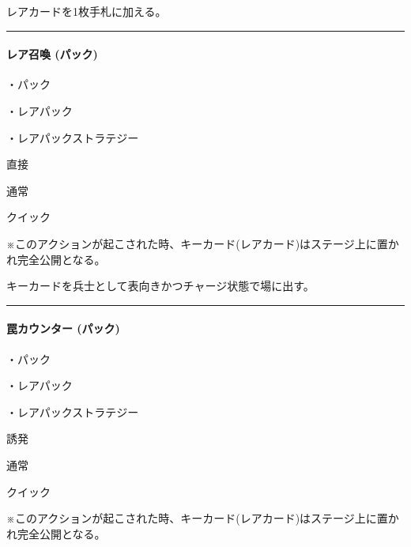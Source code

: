 \documentclass[letterpaper,10pt,dvipdfmx]{sphinxmanual}
\begin{document}
\sphinxAtStartPar
レアカードを1枚手札に加える。


\bigskip\hrule\bigskip



\paragraph{レア召喚 (パック)}
\label{\detokenize{auto/frameActionlist:act-summonsrare}}\label{\detokenize{auto/frameActionlist:id5}}
\sphinxAtStartPar
{}

\sphinxAtStartPar
・パック

\sphinxAtStartPar
・レアパック

\sphinxAtStartPar
・レアパックストラテジー

\sphinxAtStartPar
{} 直接

\sphinxAtStartPar
{} 通常

\sphinxAtStartPar
{} クイック

\sphinxAtStartPar
{} ※このアクションが起こされた時、キーカード(レアカード)はステージ上に置かれ完全公開となる。

\sphinxAtStartPar
{}

\sphinxAtStartPar
キーカードを兵士として表向きかつチャージ状態で場に出す。


\bigskip\hrule\bigskip



\paragraph{罠カウンター (パック)}
\label{\detokenize{auto/frameActionlist:act-trapcounter}}\label{\detokenize{auto/frameActionlist:id6}}
\sphinxAtStartPar
{}

\sphinxAtStartPar
・パック

\sphinxAtStartPar
・レアパック

\sphinxAtStartPar
・レアパックストラテジー

\sphinxAtStartPar
{} 誘発

\sphinxAtStartPar
{} 通常

\sphinxAtStartPar
{} クイック

\sphinxAtStartPar
{} ※このアクションが起こされた時、キーカード(レアカード)はステージ上に置かれ完全公開となる。
\end{document}
